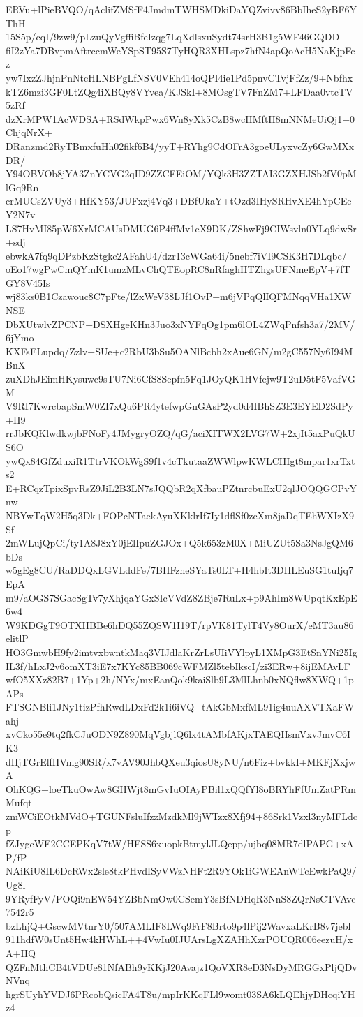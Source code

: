 ERVu+lPieBVQO/qAclifZMSfF4JmdmTWHSMDkiDaYQZvivv86BbIheS2yBF6YThH
15S5p/cqI/9zw9/pLzuQyVgffiBfeIzqg7LqXdlsxuSydt74srH3B1g5WF46GQDD
fiI2zYa7DBvpmAftrccmWeYSpST95S7TyHQR3XHLspz7hfN4apQoAcH5NaKjpFcz
yw7IxzZJhjnPnNtcHLNBPgLfNSV0VEh414oQPI4ie1Pd5pnvCTvjFfZz/9+Nbfhx
kTZ6mzi3GF0LtZQg4iXBQy8VYvea/KJSkI+8MOsgTV7FnZM7+LFDaa0vtcTV5zRf
dzXrMPW1AcWDSA+RSdWkpPwx6Wn8yXk5CzB8wcHMftH8mNNMeUiQj1+0ChjqNrX+
DRanzmd2RyTBmxfuHh02fikf6B4/yyT+RYhg9CdOFrA3goeULyxvcZy6GwMXxDR/
Y94OBVOb8jYA3ZnYCVG2qID9ZZCFEiOM/YQk3H3ZZTAI3GZXHJSb2fV0pMlGq9Rn
crMUCsZVUy3+HfKY53/JUFxzj4Vq3+DBfUkaY+tOzd3IHySRHvXE4hYpCEeY2N7v
LS7HvMI85pW6XrMCAUsDMUG6P4ffMv1eX9DK/ZShwFj9CIWsvln0YLq9dwSr+sdj
ebwkA7fq9qDPzbKzStgkc2AFahU4/dzr13cWGa64i/5nebf7iVI9CSK3H7DLqbc/
oEo17wgPwCmQYmK1umzMLvChQTEopRC8nRfaghHTZhgsUFNmeEpV+7fTGY8V45Is
wj83ks0B1Czawouc8C7pFte/lZxWeV38LJf1OvP+m6jVPqQlIQFMNqqVHa1XWNSE
DbXUtwlvZPCNP+DSXHgeKHn3Juo3xNYFqOg1pm6lOL4ZWqPnfsh3a7/2MV/6jYmo
KXFsELupdq/Zzlv+SUe+c2RbU3bSu5OANlBcbh2xAue6GN/m2gC557Ny6I94MBnX
zuXDhJEimHKysuwe9sTU7Ni6CfS8Sepfn5Fq1JOyQK1HVfejw9T2uD5tF5VafVGM
V9RI7KwrcbapSmW0ZI7xQu6PR4ytefwpGnGAsP2yd0d4IBhSZ3E3EYED2SdPy+H9
rrJbKQKlwdkwjbFNoFy4JMygryOZQ/qG/aciXITWX2LVG7W+2xjIt5axPuQkUS6O
ywQx84GfZduxiR1TtrVKOkWgS9f1v4cTkutaaZWWlpwKWLCHIgt8mpar1xrTxts2
E+RCqzTpixSpvRsZ9JiL2B3LN7sJQQbR2qXfbauPZtnrcbuExU2qlJOQQGCPvYnw
NBYwTqW2H5q3Dk+FOPcNTaekAyuXKklrIf7Iy1dflSf0zcXm8jaDqTEhWXIzX9Sf
2mWLujQpCi/ty1A8J8xY0jElIpuZGJOx+Q5k653zM0X+MiUZUt5Sa3NsJgQM6bDs
w5gEg8CU/RaDDQxLGVLddFe/7BHFzheSYaTs0LT+H4hbIt3DHLEuSG1tuIjq7EpA
m9/aOGS7SGacSgTv7yXhjqaYGxSIcVVdZ8ZBje7RuLx+p9AhIm8WUpqtKxEpE6w4
W9KDGgT9OTXHBBe6hDQ55ZQSW1I19T/rpVK81TylT4Vy8OurX/eMT3au86elitlP
HO3GmwbH9fy2imtvxbwntkMaq3VIJdlaKrZrLsUIiVYlpyL1XMpG3EtSnYNi25Ig
IL3f/hLxJ2v6omXT3iE7x7KYc85BB069cWFMZl5tebIkscI/zi3ERw+8ijEMAvLF
wfO5XXz82B7+1Yp+2h/NYx/mxEanQok9kaiSlb9L3MlLhnb0xNQflw8XWQ+1pAPs
FTSGNBli1JNy1tizPfhRwdLDxFd2k1i6iVQ+tAkGbMxfML91ig4uuAXVTXaFWahj
xvCko55e9tq2fkCJuODN9Z890MqVgbjlQ6lx4tAMbfAKjxTAEQHsmVxvJmvC6IK3
dHjTGrElfHVmg90SR/x7vAV90JhbQXeu3qiosU8yNU/n6Fiz+bvkkI+MKFjXxjwA
OhKQG+loeTkuOwAw8GHWjt8mGvIuOIAyPBil1xQQfYl8oBRYhFfUmZatPRmMufqt
zmWCiEOtkMVdO+TGUNFsluIfzzMzdkMl9jWTzx8Xfj94+86Srk1Vzxl3nyMFLdcp
fZJygcWE2CCEPKqV7tW/HESS6xuopkBtmylJLQepp/ujbq08MR7dlPAPG+xAP/fP
NAiKiU8IL6DcRWx2sle8tkPHvdISyVWzNHFt2R9YOk1iGWEAnWTcEwkPaQ9/Ug8l
9YRyfFyV/POQi9nEW54YZBbNmOw0CSemY3sBfNDHqR3NnS8ZQrNsCTVAvc7542r5
bzLhjQ+GscwMVtnrY0/507AMLIF8LWq9FrF8Brto9p4lPij2WavxaLKrB8v7jebl
911hdfW0sUnt5Hw4kHWhL++4VwIu0IJUArsLgXZAHhXzrPOUQR006eezuH/xA+HQ
QZFnMthCB4tVDUe81NfABh9yKKjJ20Avajz1QoVXR8eD3NsDyMRGGxPljQDvNVnq
hgrSUyhYVDJ6PRcobQsicFA4T8u/mpIrKKqFLl9womt03SA6kLQEhjyDHcqiYHz4
